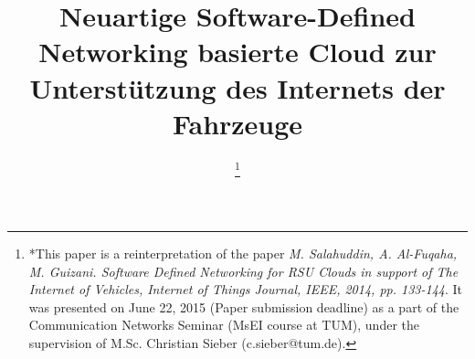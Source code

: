 \documentclass[conference]{IEEEtran}
\begin{document}
%
\title{Neuartige Software-Defined Networking basierte Cloud zur Unterstützung des Internets der Fahrzeuge}
%


\author{

\thanks{*This paper is a reinterpretation of the paper \emph{M. Salahuddin, A. Al-Fuqaha, M. Guizani. \glqq Software Defined Networking for RSU Clouds in support of The Internet of Vehicles\grqq , Internet of Things Journal, IEEE, 2014, pp. 133-144}. It was presented on June 22, 2015 (Paper submission deadline) as a part of the Communication Networks Seminar (MsEI course at TUM), under the supervision of M.Sc. 
Christian Sieber (c.sieber@tum.de).}
}


% 
\end{document}
